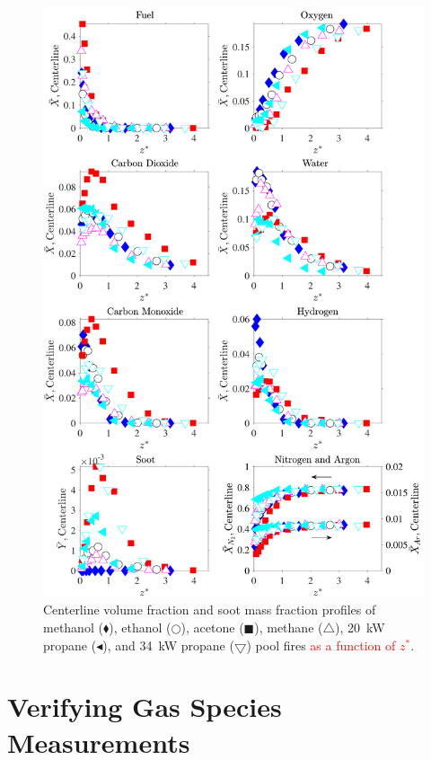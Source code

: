 \documentclass[12pt]{article}
\begin{document}
\begin{figure}[!]
	\centering
\includegraphics[width=12.5cm,keepaspectratio]{OVERALL_Fuel_Comparison.pdf}
	\caption[Centerline volume fraction and soot mass fraction profiles]{Centerline volume fraction and soot mass fraction profiles of methanol ($\blacklozenge$), ethanol ($\bigcirc$), acetone ($\blacksquare$), methane ($\triangle$), 20~kW propane ($\blacktriangleleft$), and 34~kW propane ($\bigtriangledown$) pool fires \textcolor{red}{ as a function of $z^*$}.}
	\label{fig:Fuel_Comparison}
\end{figure}


\clearpage

\section{Verifying Gas Species Measurements}
\label{ssec:Verifying_Vol_Frac_Measurements}
\end{document}
